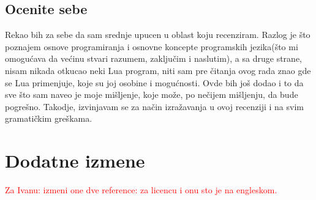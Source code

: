 \documentclass[a4paper]{report}
\newcommand{\note}[1]{\textcolor{red}{#1}}
\begin{document}
\section{Ocenite sebe}

Rekao bih za sebe da sam srednje upucen u oblast koju recenziram. Razlog je \v sto poznajem osnove programiranja i
osnovne koncepte programskih jezika(\v sto mi omogu\' cava da ve\' cinu stvari razumem, zaklju\v cim i naslutim), a sa druge strane,
nisam nikada otkucao neki Lua program, niti sam pre \v citanja ovog rada znao gde se Lua primenjuje, koje su joj osobine i mogu\' cnosti. Ovde bih jo\v s dodao i to
da sve \v sto sam naveo je moje mi\v sljenje, koje mo\v ze, po ne\v cijem mi\v sljenju, da bude pogre\v sno. Takodje, izvinjavam se za na\v cin izra\v zavanja u ovoj recenziji i na svim gramati\v ckim gre\v skama.


\chapter{Dodatne izmene}

\note{Za Ivanu: izmeni one dve reference: za licencu i onu sto je na engleskom.}
\end{document}
